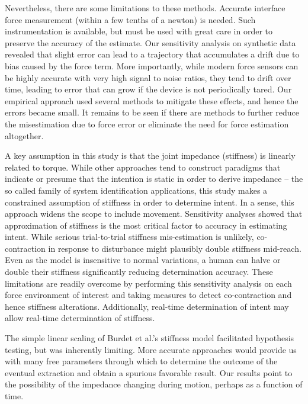\documentclass[10pt]{article}
\begin{document}
Nevertheless, there are some limitations to these methods. Accurate interface force measurement (within a few tenths of a newton) is needed. Such instrumentation is available, but must be used with great care in order to preserve the accuracy of the estimate. Our sensitivity analysis on synthetic data revealed that slight error can lead to a trajectory that accumulates a drift due to bias caused by the force term. More importantly, while modern force sensors can be highly accurate with very high signal to noise ratios, they tend to drift over time, leading to error that can grow if the device is not periodically tared. Our empirical approach used several methods to mitigate these effects, and hence the errors became small. It remains to be seen if there are methods to further reduce the misestimation due to force error or eliminate the need for force estimation altogether.  

A key assumption in this study is that the joint impedance (stiffness) is linearly related to torque. While other approaches tend to construct paradigms that indicate or presume that the intention is static in order to derive impedance -- the so called family of system identification applications, this study makes a constrained assumption of stiffness in order to determine intent. In a sense, this approach widens the scope to include movement. Sensitivity analyses showed that approximation of stiffness is the most critical factor to accuracy in estimating intent. While serious trial-to-trial stiffness mis-estimation is unlikely, co-contraction in response to disturbance might plausibly double stiffness mid-reach. Even as the model is insensitive to normal variations, a human can halve or double their stiffness \cite{franklin2007endpoint} significantly reducing determination accuracy. These limitations are readily overcome by performing this sensitivity analysis on each force environment of interest and taking measures to detect co-contraction and hence stiffness alterations. Additionally, real-time determination of intent may allow real-time determination of stiffness.

The simple linear scaling of Burdet et al.'s stiffness model \cite{burdet2006stability} facilitated hypothesis testing, but was inherently limiting. More accurate approaches would provide us with many free parameters through which to determine the outcome of the eventual extraction and obtain a spurious favorable result. Our results point to the possibility of the impedance changing during motion, perhaps as a function of time. 
\end{document}
